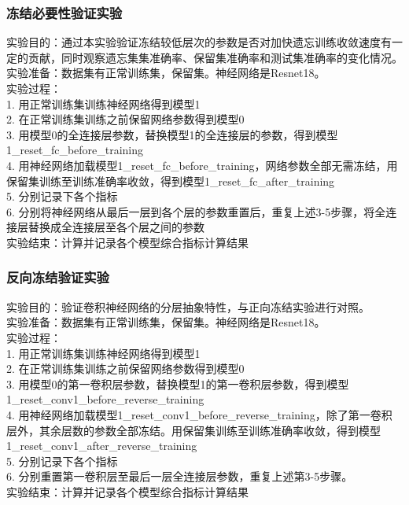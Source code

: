 \subsubsection{冻结必要性验证实验}
实验目的：通过本实验验证冻结较低层次的参数是否对加快遗忘训练收敛速度有一定的贡献，同时观察遗忘集集准确率、保留集准确率和测试集准确率的变化情况。
\\实验准备：数据集有正常训练集，保留集。神经网络是Resnet18。
\\实验过程：
\\1. 用正常训练集训练神经网络得到模型1
\\2. 在正常训练集训练之前保留网络参数得到模型0
\\3. 用模型0的全连接层参数，替换模型1的全连接层的参数，得到模型1\_reset\_fc\_before\_training
\\4. 用神经网络加载模型1\_reset\_fc\_before\_training，网络参数全部无需冻结，用保留集训练至训练准确率收敛，得到模型1\_reset\_fc\_after\_training
\\5. 分别记录下各个指标
\\6. 分别将神经网络从最后一层到各个层的参数重置后，重复上述3-5步骤，将全连接层替换成全连接层至各个层之间的参数
\\实验结束：计算并记录各个模型综合指标计算结果
\subsubsection{反向冻结验证实验}
实验目的：验证卷积神经网络的分层抽象特性，与正向冻结实验进行对照。
\\实验准备：数据集有正常训练集，保留集。神经网络是Resnet18。
\\实验过程：
\\1. 用正常训练集训练神经网络得到模型1
\\2. 在正常训练集训练之前保留网络参数得到模型0
\\3. 用模型0的第一卷积层参数，替换模型1的第一卷积层参数，得到模型1\_reset\_conv1\_before\_reverse\_training
\\4. 用神经网络加载模型1\_reset\_conv1\_before\_reverse\_training，除了第一卷积层外，其余层数的参数全部冻结。用保留集训练至训练准确率收敛，得到模型1\_reset\_conv1\_after\_reverse\_training
\\5. 分别记录下各个指标
\\6. 分别重置第一卷积层至最后一层全连接层参数，重复上述第3-5步骤。
\\实验结束：计算并记录各个模型综合指标计算结果
